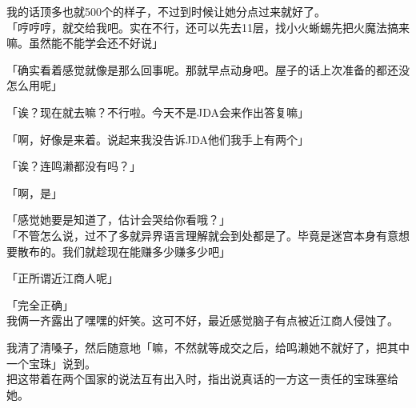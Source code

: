 我的话顶多也就500个的样子，不过到时候让她分点过来就好了。\\

「哼哼哼，就交给我吧。实在不行，还可以先去11层，找小火蜥蜴先把火魔法搞来嘛。虽然能不能学会还不好说」

「确实看着感觉就像是那么回事呢。那就早点动身吧。屋子的话上次准备的都还没怎么用呢」

「诶？现在就去嘛？不行啦。今天不是JDA会来作出答复嘛」

「啊，好像是来着。说起来我没告诉JDA他们我手上有两个」

「诶？连鸣濑都没有吗？」

「啊，是」

「感觉她要是知道了，估计会哭给你看哦？」\\

「不管怎么说，过不了多就异界语言理解就会到处都是了。毕竟是迷宫本身有意想要散布的。我们就趁现在能赚多少赚多少吧」

「正所谓近江商人呢」

「完全正确」\\

我俩一齐露出了嘿嘿的奸笑。这可不好，最近感觉脑子有点被近江商人侵蚀了。

我清了清嗓子，然后随意地「嘛，不然就等成交之后，给鸣濑她不就好了，把其中一个宝珠」说到。\\

把这带着在两个国家的说法互有出入时，指出说真话的一方这一责任的宝珠塞给她。

